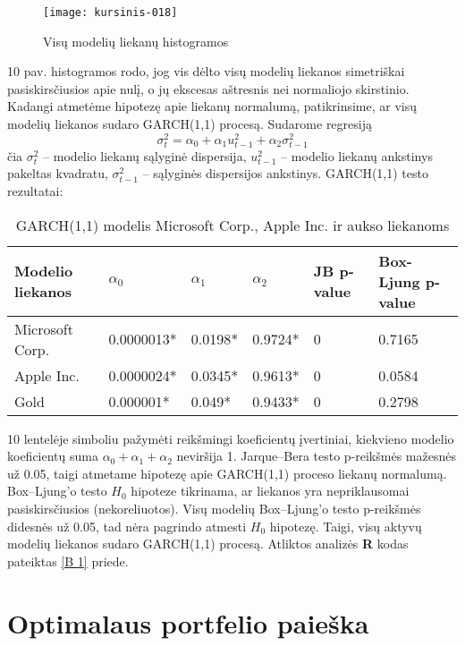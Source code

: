 \documentclass[12pt, a14paper, lithuanian]{article}
\begin{document}
\begin{figure}[H]
  \centering
\texttt{[image: kursinis-018]}
  \caption{Visų modelių liekanų histogramos}
  \label{fig:10}
\end{figure}

10 pav. histogramos rodo, jog vis dėlto visų modelių liekanos simetriškai pasiskirsčiusios apie nulį, o jų ekscesas aštresnis nei normaliojo skirstinio.\\

Kadangi atmetėme hipotezę apie liekanų normalumą, patikrinsime, ar visų modelių liekanos sudaro GARCH(1,1) procesą\cite{brook}. Sudarome regresiją $$\sigma_t^2 = \alpha_0 + \alpha_1 u_{t-1}^2 + \alpha_2  \sigma^2_{t-1} $$
čia $\sigma_t^2$ -- modelio liekanų sąlyginė dispersija, $u_{t-1}^2$ -- modelio liekanų ankstinys pakeltas kvadratu, $\sigma^2_{t-1}$ -- sąlyginės dispersijos ankstinys. GARCH(1,1) testo rezultatai:

\begin{table}[ht]
\begin{center}
    \begin{tabular}{ | l | l | l | l | l | l |}
    \hline
     Modelio liekanos  &  $ \alpha_0 $  & $ \alpha_1 $ & $ \alpha_2 $ & JB p-value & Box-Ljung p-value \\
    \hline
  Microsoft Corp. & 0.0000013* & 0.0198*& 0.9724*& 0 & 0.7165\\
	Apple Inc. & 0.0000024*& 0.0345*& 0.9613*& 0 & 0.0584 \\
	Gold &  0.000001* & 0.049* & 0.9433*& 0 & 0.2798  \\
	\hline
    \end{tabular}
\end{center}
\caption{GARCH(1,1) modelis Microsoft Corp., Apple Inc. ir aukso liekanoms}
\end{table}


10 lentelėje \ast simboliu pažymėti reikšmingi koeficientų įvertiniai, kiekvieno modelio koeficientų suma
$ \alpha_0 + \alpha_1 + \alpha_2 $ neviršija 1. Jarque--Bera testo p-reikšmės mažesnės už 0.05, taigi atmetame hipotezę apie GARCH(1,1) proceso liekanų normalumą. Box--Ljung'o testo $H_0$ hipoteze tikrinama, ar liekanos yra nepriklausomai pasiskirsčiusios (nekoreliuotos). Visų modelių Box--Ljung'o testo p-reikšmės didesnės už 0.05, tad nėra pagrindo atmesti $H_0$ hipotezę. Taigi, visų aktyvų modelių liekanos sudaro GARCH(1,1) procesą. Atliktos analizės \textbf{R} kodas pateiktas \ref{B 1} priede.


\newpage
\section{Optimalaus portfelio paieška}   
\end{document}
